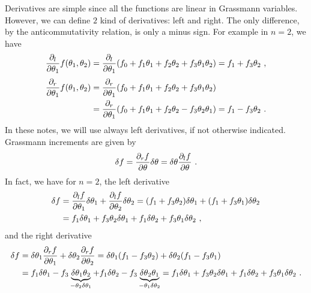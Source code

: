    Derivatives are simple since all the functions are linear in Grassmann variables. However, we can define $2$ kind of derivatives: left and right. The only difference, by the anticommutativity relation, is only a minus sign. For example in $n = 2$, we have 
    \begin{equation*}
        \frac{\partial_l}{\partial\theta_1} f(\theta_1, \theta_2) = \frac{\partial_l}{\partial\theta_1} (f_0 + f_1 \theta_1 + f_2 \theta_2 + f_3 \theta_1 \theta_2) = f_1 + f_3 \theta_2 ~,
    \end{equation*}
    \begin{equation*}
    \begin{aligned}
        \frac{\partial_r}{\partial\theta_1} f(\theta_1, \theta_2) & = \frac{\partial_r}{\partial\theta_1} (f_0 + f_1 \theta_1 + f_2 \theta_2 + f_3 \theta_1 \theta_2) \\ & = \frac{\partial_r}{\partial\theta_1} (f_0 + f_1 \theta_1 + f_2 \theta_2 - f_3 \theta_2 \theta_1) = f_1 - f_3 \theta_2 ~.
    \end{aligned}
    \end{equation*}
    In these notes, we will use always left derivatives, if not otherwise indicated. Grassmann increments are given by 
    \begin{equation*}
        \delta f = \frac{\partial_r f}{\partial\theta} \delta \theta = \delta \theta \frac{\partial_l f}{\partial\theta} ~.
    \end{equation*}
    In fact, we have for $n=2$, the left derivative
    \begin{equation*}
    \begin{aligned}
        \delta f & = \frac{\partial_l f}{\partial\theta_1} \delta \theta_1 + \frac{\partial_l f}{\partial\theta_2} \delta \theta_2 = (f_1 + f_3 \theta_2) \delta \theta_1 + (f_1 + f_3 \theta_1) \delta \theta_2 \\ & = f_1 \delta \theta_1 + f_3 \theta_2 \delta \theta_1 + f_1 \delta \theta_2 + f_3 \theta_1 \delta \theta_2 ~,
    \end{aligned}
    \end{equation*}
    and the right derivative
    \begin{equation*}
    \begin{aligned}
        \delta f & = \delta \theta_1 \frac{\partial_r f}{\partial\theta_1} + \delta \theta_2 \frac{\partial_r f}{\partial\theta_2} = \delta \theta_1 (f_1 - f_3 \theta_2) + \delta \theta_2 (f_1 - f_3 \theta_1) \\ & = f_1 \delta \theta_1 - f_3 \underbrace{\delta \theta_1 \theta_2}_{- \theta_2 \delta \theta_1} + f_1 \delta \theta_2 - f_3 \underbrace{\delta \theta_2 \theta_1}_{- \theta_1 \delta \theta_2} = f_1 \delta \theta_1 + f_3 \theta_2 \delta \theta_1 + f_1 \delta \theta_2 + f_3 \theta_1 \delta \theta_2 ~.
    \end{aligned}
    \end{equation*}
    
